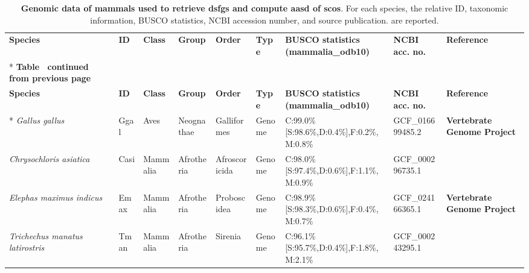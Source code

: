 \documentclass[../main.tex]{subfiles}
\begin{document}
\begin{landscape}
	\tiny
	\begin{longtable}{lllllllll}
		\caption{\textbf{Genomic data of mammals used to retrieve \glspl{dsfg} and compute \gls{aasd} of \glspl{sco}}. For each species, the relative ID, taxonomic information, BUSCO statistics, NCBI accession number, and source publication. are reported.}
		\label{suppTab:mammal_dataset}                                                                                                                                                                                                                    \\
		\toprule
		\textbf{Species}                        & \textbf{ID} & \textbf{Class} & \textbf{Group}   & \textbf{Order}  & \textbf{Type} & \textbf{BUSCO statistics (mammalia\_odb10)}    & \textbf{NCBI acc. no.} & \textbf{Reference}                        \\* \midrule \midrule
		\endfirsthead
		\multicolumn{9}{c}%
		{{\bfseries Table \thetable\ continued from previous page}}                                                                                                                                                                                       \\
		\toprule
		\textbf{Species}                        & \textbf{ID} & \textbf{Class} & \textbf{Group}   & \textbf{Order}  & \textbf{Type} & \textbf{BUSCO statistics (mammalia\_odb10)}    & \textbf{NCBI acc. no.} & \textbf{Reference}                        \\* \midrule \midrule
		\endhead
		\textit{Gallus gallus}                  & Ggal        & Aves           & Neognathae       & Galliformes     & Genome        & C:99.0\%{[}S:98.6\%,D:0.4\%{]},F:0.2\%,M:0.8\% & GCF\_016699485.2       & \textbf{Vertebrate Genome Project}        \\
		\textit{Chrysochloris asiatica}         & Casi        & Mammalia       & Afrotheria       & Afroscoricida   & Genome        & C:98.0\%{[}S:97.4\%,D:0.6\%{]},F:1.1\%,M:0.9\% & GCF\_000296735.1       & \textbf{\cite{murata2003afrotherian}}     \\
		\textit{Elephas maximus indicus}        & Emax        & Mammalia       & Afrotheria       & Proboscidea     & Genome        & C:98.9\%{[}S:98.3\%,D:0.6\%{]},F:0.4\%,M:0.7\% & GCF\_024166365.1       & \textbf{Vertebrate Genome Project}        \\
		\textit{Trichechus manatus latirostris} & Tman        & Mammalia       & Afrotheria       & Sirenia         & Genome        & C:96.1\%{[}S:95.7\%,D:0.4\%{]},F:1.8\%,M:2.1\% & GCF\_000243295.1       & \textbf{\cite{foote2015convergent}}       \\

\end{longtable}
\end{landscape}
\end{document}
